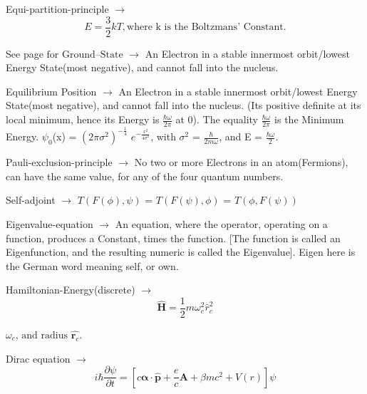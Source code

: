 \documentclass[a4paper, 10pt, onepage]{elegantbook}
\begin{document}
{Equi-partition-principle $\longrightarrow$
\begin{equation}
E = \frac{3}{2}kT, \text{where k is the Boltzmans' Constant.}
\end{equation}

See page \pageref{Sampled wave-function distribution} $\text{for Ground--State}$ $\longrightarrow$ An Electron in a 
stable innermost orbit/lowest Energy State(most negative), and cannot fall into the nucleus.  

Equilibrium Position $\longrightarrow$ An Electron in a stable innermost orbit/lowest Energy State(most negative), and 
cannot fall into the nucleus.
(Its positive definite at its local minimum, hence its Energy is $\frac{\hbar \omega}{2 \pi}$ at 0). The equality 
$\frac{\hbar \omega}{2 \pi}$ is the Minimum Energy. $\psi_0$(x) = $(2 \pi \sigma^2)^{- \frac{1}{4}}$ $e^{- \frac{x^2}{4 
\sigma^2}}$, with $\sigma^2$ = $\frac{\hbar}{2m \omega}$, and E = $\frac{\hbar \omega}{2}$. 
 
Pauli-exclusion-principle $\longrightarrow$ No two or more Electrons in an 
atom(Fermions), can have the same value, for any of the four quantum numbers. 
 
Self-adjoint $\longrightarrow$ $T(F(\phi), \psi)$ = $T(F(\psi), \phi)$ = $T(\phi, F(\psi))$  
 
Eigenvalue-equation $\longrightarrow$ An equation, where the operator, operating on a 
function, produces a Constant, times the function. [The function is called
an Eigenfunction, and the resulting numeric is called the Eigenvalue]. Eigen here is the German word meaning self, or 
own.  
               
Hamiltonian-Energy(discrete)   $\longrightarrow$
\begin{equation}
\hat {\mathbf H} = \frac{1}{2} m \omega^2_c \hat {r}^2_c
\end{equation}

 $\omega_c$, $\text{and radius}$ 
$\hat {\mathbf {r}_c}$.

Dirac equation $\longrightarrow$
\begin{equation}
i \hbar \frac{\partial \psi}{\partial t} =  \left[ c {\mathbf \alpha} \cdot \hat {\mathbf p} + \frac{e}{c} {\mathbf A} 
+ {\beta m} {c^2} + V(r) \right] \psi
\end{equation}

}
\end{document}
